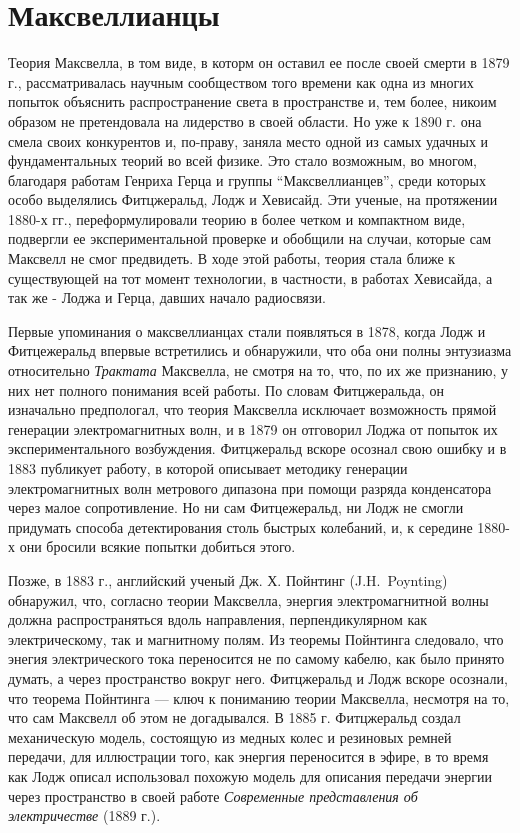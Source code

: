 \documentclass[12pt, oneside, a4paper]{article}
\begin{document}
\section*{Максвеллианцы}
Теория Максвелла, в том виде, в которм он оставил ее после своей смерти в 1879 г., рассматривалась научным сообществом того времени как одна из многих попыток объяснить распространение света в пространстве и, тем более, никоим образом не претендовала на лидерство в своей области. Но уже к 1890 г. она смела своих конкурентов и, по-праву, заняла место одной из самых удачных и фундаментальных теорий во всей физике. Это стало возможным, во многом, благодаря работам Генриха Герца и группы ``Максвеллианцев'', среди которых особо выделялись Фитцжеральд, Лодж и Хевисайд. Эти ученые, на протяжении 1880-х гг., переформулировали теорию в более четком и компактном виде, подвергли ее экспериментальной проверке  и обобщили на случаи, которые сам Максвелл не смог предвидеть. В ходе этой работы, теория стала ближе к существующей на тот момент технологии, в частности, в работах Хевисайда, а так же - Лоджа и Герца, давших начало радиосвязи.

Первые упоминания о максвеллианцах стали появляться в 1878, когда Лодж и Фитцежеральд впервые встретились и обнаружили, что оба они полны энтузиазма относительно \emph{Трактата} Максвелла, не смотря на то, что, по их же признанию, у них нет полного понимания всей работы. По словам Фитцжеральда, он изначально предпологал, что теория Максвелла исключает возможность прямой генерации электромагнитных волн, и в 1879 он отговорил Лоджа от попыток их экспериментального возбуждения. Фитцжеральд вскоре осознал свою ошибку и в 1883 публикует работу, в которой описывает методику генерации электромагнитных волн метрового дипазона при помощи разряда конденсатора через малое сопротивление. Но ни сам Фитцежеральд, ни Лодж не смогли придумать способа детектирования столь быстрых колебаний, и, к середине 1880-х они бросили всякие попытки добиться этого.

Позже, в 1883 г., английский ученый Дж. Х. Пойнтинг (J.H.~Poynting) обнаружил, что, согласно теории Максвелла, энергия электромагнитной волны должна распространяться вдоль направления, перпендикулярном как электрическому, так и магнитному полям. Из теоремы Пойнтинга следовало, что энегия электрического тока переносится не по самому кабелю, как было принято думать, а через пространство вокруг него. Фитцжеральд и Лодж вскоре осознали, что теорема Пойнтинга --- ключ к пониманию теории Максвелла, несмотря на то, что сам Максвелл об этом не догадывался. В 1885 г. Фитцжеральд создал механическую модель, состоящую из медных колес и резиновых ремней передачи, для иллюстрации того, как энергия переносится в эфире, в то время как Лодж описал использовал похожую модель для описания передачи энергии через пространство в своей работе \emph{Современные представления об электричестве} (1889 г.).
\end{document}
